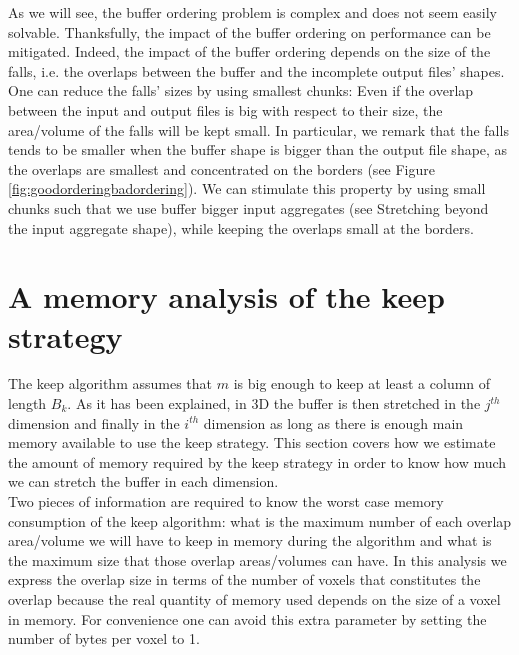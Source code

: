 \documentclass[conference]{IEEEtran}
\begin{document}
As we will see, the buffer ordering problem is complex and does not seem easily solvable.
Thanksfully, the impact of the buffer ordering on performance can be mitigated.
Indeed, the impact of the buffer ordering depends on the size of the falls, i.e. the overlaps between the buffer and the incomplete output files' shapes.
One can reduce the falls' sizes by using smallest chunks:
Even if the overlap between the input and output files is big with respect to their size, the area/volume of the falls will be kept small.
In particular, we remark that the falls tends to be smaller when the buffer shape is bigger than the output file shape, as the overlaps are smallest and concentrated on the borders (see Figure \ref{fig:goodorderingbadordering}).
We can stimulate this property by using small chunks such that we use buffer bigger input aggregates (see Stretching beyond the input aggregate shape), while keeping the overlaps small at the borders.

\section*{A memory analysis of the keep strategy}
The keep algorithm assumes that $m$ is big enough to keep at least a column of length $B_k$. %
As it has been explained, in 3D the buffer is then stretched in the $j^{th}$ dimension and finally in the $i^{th}$ dimension as long as there is enough main memory available to use the keep strategy.
This section covers how we estimate the amount of memory required by the keep strategy in order to know how much we can stretch the buffer in each dimension. \\

Two pieces of information are required to know the worst case memory consumption of the keep algorithm: what is the maximum number of each overlap area/volume we will have to keep in memory during the algorithm and what is the maximum size that those overlap areas/volumes can have.
In this analysis we express the overlap size in terms of the number of voxels that constitutes the overlap because the real quantity of memory used depends on the size of a voxel in memory.
For convenience one can avoid this extra parameter by setting the number of bytes per voxel to 1.
\end{document}
